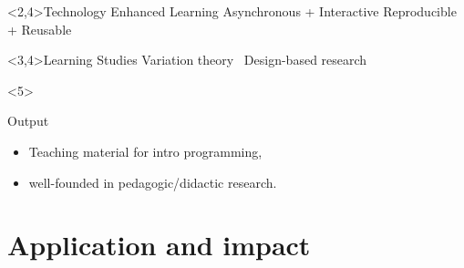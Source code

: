 \begin{frame}
  \begin{block}<2,4>{Technology Enhanced Learning}
    \hitem Asynchronous + Interactive
    \quad
    \hitem Reproducible + Reusable
  \end{block}

  \begin{center}
    \Large\bfseries
  \end{center}

  \begin{block}<3,4>{Learning Studies}
    \hitem Variation theory~\parencite{VariationTheory}
    \qquad
    \hitem Design-based research~\parencite{DesignBasedResearch}
  \end{block}

  \begin{onlyenv}<5>
    \begin{alertblock}{Output}
      \begin{itemize}
        \item Teaching material for intro programming,
        \item well-founded in pedagogic/didactic research.
      \end{itemize}
    \end{alertblock}
  \end{onlyenv}
\end{frame}

\section{Application and impact}

